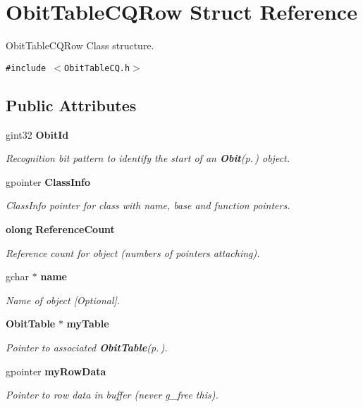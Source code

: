 \section{Obit\-Table\-CQRow Struct Reference}
\label{structObitTableCQRow}
Obit\-Table\-CQRow Class structure.  


{\tt \#include $<$Obit\-Table\-CQ.h$>$}

\subsection*{Public Attributes}
\begin{CompactItemize}
\item 
gint32 {\bf Obit\-Id}
\begin{CompactList}\small\item\em Recognition bit pattern to identify the start of an {\bf Obit}{\rm (p.\,\pageref{structObit})} object. \item\end{CompactList}\item 
gpointer {\bf Class\-Info}
\begin{CompactList}\small\item\em Class\-Info pointer for class with name, base and function pointers. \item\end{CompactList}\item 
{\bf olong} {\bf Reference\-Count}
\begin{CompactList}\small\item\em Reference count for object (numbers of pointers attaching). \item\end{CompactList}\item 
gchar $\ast$ {\bf name}
\begin{CompactList}\small\item\em Name of object [Optional]. \item\end{CompactList}\item 
{\bf Obit\-Table} $\ast$ {\bf my\-Table}
\begin{CompactList}\small\item\em Pointer to associated {\bf Obit\-Table}{\rm (p.\,\pageref{structObitTable})}. \item\end{CompactList}\item 
gpointer {\bf my\-Row\-Data}
\begin{CompactList}\small\item\em Pointer to row data in buffer (never g\_\-free this). \item\end{CompactList}\item 

\end{CompactItemize}
